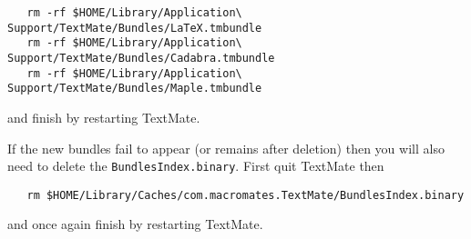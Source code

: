 \documentclass[12pt]{article}
\begin{document}
\begin{lstlisting}
   rm -rf $HOME/Library/Application\ Support/TextMate/Bundles/LaTeX.tmbundle
   rm -rf $HOME/Library/Application\ Support/TextMate/Bundles/Cadabra.tmbundle
   rm -rf $HOME/Library/Application\ Support/TextMate/Bundles/Maple.tmbundle
\end{lstlisting}

and finish by restarting TextMate.

If the new bundles fail to appear (or remains after deletion) then you will also need to delete the {\tt\small BundlesIndex.binary}. First quit TextMate then

\begin{lstlisting}
   rm $HOME/Library/Caches/com.macromates.TextMate/BundlesIndex.binary
\end{lstlisting}

and once again finish by restarting TextMate.
\end{document}
